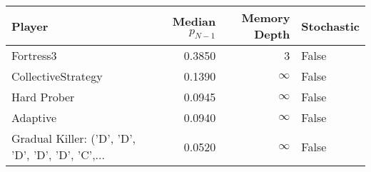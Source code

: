 \begin{tabular}{lrrl}
\toprule
                                            Player &  Median $p_{N-1}$ &  Memory Depth & Stochastic \\
\midrule
                                         Fortress3 &            0.3850 &             3 &      False \\
                                CollectiveStrategy &            0.1390 &            \(\infty\) &      False \\
                                       Hard Prober &            0.0945 &            \(\infty\) &      False \\
                                          Adaptive &            0.0940 &            \(\infty\) &      False \\
 Gradual Killer: ('D', 'D', 'D', 'D', 'D', 'C',... &            0.0520 &            \(\infty\) &      False \\
\bottomrule
\end{tabular}
